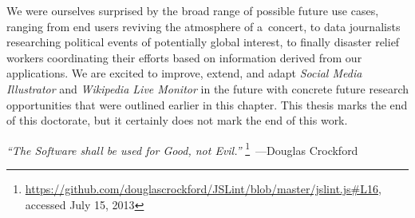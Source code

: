We were ourselves surprised by the broad range
of possible future use cases, ranging from end users
reviving the atmosphere of a~concert,
to data journalists researching political events
of potentially global interest,
to finally disaster relief workers coordinating
their efforts based on information derived from our applications.
We are excited to improve, extend, and adapt
\emph{Social Media Illustrator} and \emph{Wikipedia Live Monitor}
in the future with concrete future research opportunities
that were outlined earlier in this chapter.
This thesis marks the end of this doctorate,
but it certainly does not mark the end of this work.

\begin{flushright}
\textit{``The Software shall be used for Good, not Evil.''}%
\footnote{\url{https://github.com/douglascrockford/JSLint/blob/master/jslint.js\#L16},
accessed July 15, 2013}~---Douglas Crockford
\end{flushright}


\clearpage

